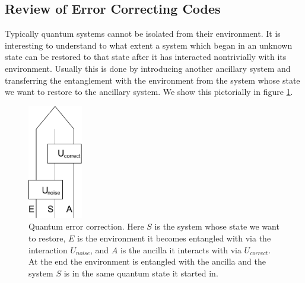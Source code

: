 \documentclass[12pt]{article}
\begin{document}
\subsection{Review of Error Correcting Codes}\label{ecrev}
Typically quantum systems cannot be isolated from their environment.  It is interesting to understand to what extent a system which began in an unknown state can be restored to that state after it has interacted nontrivially with its environment.  Usually this is done by introducing another ancillary system and transferring the entanglement with the environment from the system whose state we want to restore to the ancillary system.  We show this pictorially in figure \ref{correction}.
\begin{figure}
\begin{center}
\includegraphics[height=5cm]{correction.pdf}
\end{center}
\caption{Quantum error correction.  Here $S$ is the system whose state we want to restore, $E$ is the environment it becomes entangled with via the interaction $U_{noise}$, and $A$ is the ancilla it interacts with via $U_{correct}$.  At the end the environment is entangled with the ancilla and the system $S$ is in the same quantum state it started in.}\label{correction}
\end{figure} 
\end{document}
